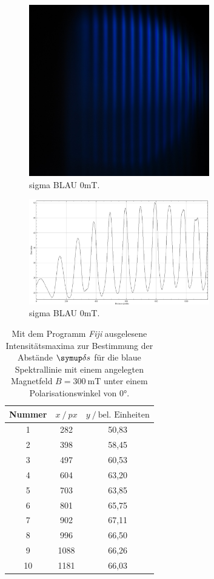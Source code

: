\begin{figure}
  \centering
  \includegraphics[width=0.7\textwidth]{bilder/3000_BLAU_0mT_sigma.jpg}
  \caption{sigma BLAU 0mT.}
  \label{abb:sigmablau0mT}
\end{figure}
\begin{figure}
  \centering
  \includegraphics[width=0.7\textwidth]{bilder/sigmaBLAU_0mT.PNG}
  \caption{sigma BLAU 0mT.}
  \label{abb:plotsigmablau0mT}
\end{figure}

\begin{table}[H]
  \centering
  \caption{Mit dem Programm \textit{Fiji} \cite{Fiji} ausgelesene Intensitätsmaxima zur Bestimmung der Abstände $\deltaup s$ für die blaue Spektrallinie mit einem angelegten Magnetfeld $B=\SI{300}{\milli\tesla}$  unter einem Polarisationswinkel von $0°$.}
  \label{tab:277-Max}
  \begin{tabular}{c|cc}
    \toprule
    {Nummer} & {$x \:/\: \si{px}$} & {$y \:/\: \text{bel. Einheiten}$}\\
    \midrule
 1 &  282  &	 50,83 \\
 2 &  398  &	 58,45 \\
 3 &  497  &	 60,53 \\
 4 &  604  &	 63,20 \\
 5 &  703  &	 63,85 \\
 6 &  801  &	 65,75 \\
 7 &  902  &	 67,11 \\
 8 &  996  &	 66,50 \\
 9 &  1088 &   66,26 \\
10 &  1181 &	 66,03 \\
  \end{tabular}
\end{table}

